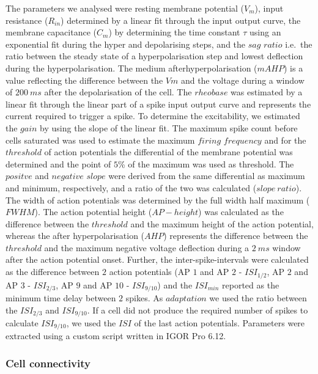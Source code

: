 \documentclass[
  12pt,
  a4paper,
  openany]{book}
\begin{document}
The parameters we analysed were resting membrane potential (\(V_{m}\)), input resistance (\(R_{in}\)) determined by a linear fit through the input output curve, the membrane capacitance (\(C_{m}\)) by determining the time constant \(\tau\) using an exponential fit during the hyper and depolarising steps, and the \(sag\) \(ratio\) i.e.~the ratio between the steady state of a hyperpolarisation step and lowest deflection during the hyperpolarisation. The medium afterhyperpolarisation (\(mAHP\)) is a value reflecting the difference between the \(Vm\) and the voltage during a window of \(200\ ms\) after the depolarisation of the cell. The \(rheobase\) was estimated by a linear fit through the linear part of a spike input output curve and represents the current required to trigger a spike. To determine the excitability, we estimated the \(gain\) by using the slope of the linear fit. The maximum spike count before cells saturated was used to estimate the maximum \(firing\) \(frequency\) and for the \(threshold\) of action potentials the differential of the membrane potential was determined and the point of \(5\)\% of the maximum was used as threshold. The \(positve\) and \(negative\) \(slope\) were derived from the same differential as maximum and minimum, respectively, and a ratio of the two was calculated (\(slope\ ratio\)). The width of action potentials was determined by the full width half maximum (\(FWHM\)). The action potential height (\(AP-height\)) was calculated as the difference between the \(threshold\) and the maximum height of the action potential, whereas the after hyperpolarisation (\(AHP\)) represents the difference between the \(threshold\) and the maximum negative voltage deflection during a \(2\ ms\) window after the action potential onset. Further, the inter-spike-intervals were calculated as the difference between \(2\) action potentials (AP \(1\) and AP \(2\) - \(ISI_{1/2}\), AP \(2\) and AP \(3\) - \(ISI_{2/3}\), AP \(9\) and AP \(10\) - \(ISI_{9/10}\)) and the \(ISI_{min}\) reported as the minimum time delay between \(2\) spikes. As \(adaptation\) we used the ratio between the \(ISI_{2/3}\) and \(ISI_{9/10}\). If a cell did not produce the required number of spikes to calculate \(ISI_{9/10}\), we used the \(ISI\) of the last action potentials. Parameters were extracted using a custom script written in IGOR Pro 6.12.

\hypertarget{cell-connectivity}{%
\subsubsection{Cell connectivity}\label{cell-connectivity}}
\end{document}
